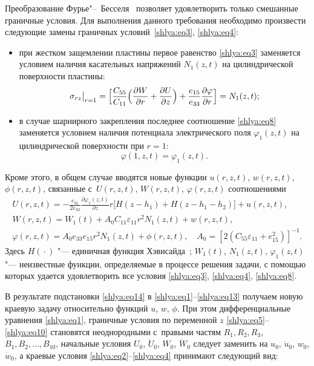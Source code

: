 Преобразование Фурье"--~Бесселя~\cite{shlya:bib23} позволяет удовлетворить только смешанные 
граничные условия. 
Для выполнения данного требования необходимо произвести следующие замены граничных условий~\eqref{shlya:eq3}, \eqref{shlya:eq4}:

\begin{itemize}
\item при жестком защемлении пластины первое равенство \eqref{shlya:eq3} заменяется условием 
наличия касательных напряжений $N_1 (z,t)$ на цилиндрической 
поверхности пластины: 
\begin{equation}
\label{shlya:eq13}
\sigma _{rz}\big|_{r=1} =
\Bigl[
\frac{C_{55}}{C_{11}}\Bigl(\frac{\partial 
W}{\partial r}+\frac{\partial U}{\partial z}\Bigr)+\frac{e_{15} }{e_{33}  }\frac{\partial \varphi }{\partial r}\Bigr] =N_1 (z,t);
\end{equation}

\item в случае шарнирного закрепления последнее соотношение \eqref{shlya:eq8} заменяется 
условием наличия потенциала электрического поля $\varphi _1 ( z,t)$ на цилиндрической поверхности при $r=1$:
\begin{equation}
\label{shlya:eq13}
\varphi ( {1,z,t} )=\varphi _1 ( {z,t} ).
\end{equation}
\end{itemize}

Кроме этого, в общем случае вводятся новые функции $u(r,z,t)$, $w(r,z,t)$, $\phi (r,z,t)$, связанные с~$U(r,z,t)$, $W(r,z,t)$, $\varphi (r,z,t)$ соотношениями
\begin{gather}
U(r,z,t)=-\frac{e_{31} }{2e_{33} }\frac{\partial \varphi _1 
(z,t)}{\partial z}r\big[ H(z-h_1)+H(z-h_1 -h_2) \big]+u(r,z,t),\\
W(r,z,t)=W_1 ( t )+A_0 C_{11} \varepsilon _{11} 
r^2N_1 (z,t)+w(r,z,t), \label{shlya:eq14}\\
\varphi (r,z,t)=A_0 e_{33} e_{15} r^2N_1 ( z,t)+\phi (r,z,t),
\quad
A_0 =\left[ 2 \left(C_{55} \varepsilon _{11} +e_{15}^2 \right) \right]^{-1}.
\end{gather}
Здесь $H({}\cdot{})$ "--- единичная функция Хэвисайда~\cite{shlya:bib25}; $W_1 (t )$, $N_1 (z,t)$, $\varphi _1 (z,t)$ "--- 
неизвестные функции, определяемые в процессе решения задачи, с помощью 
которых удается удовлетворить все условия \eqref{shlya:eq3}, \eqref{shlya:eq4}, \eqref{shlya:eq8}. 



В результате подстановки \eqref{shlya:eq14} в \eqref{shlya:eq1}--\eqref{shlya:eq13} получаем новую краевую задачу 
относительно функций $u$, $w$, $\phi$. 
При этом дифференциальные уравнения \eqref{shlya:eq1}, 
граничные условия по переменной $z$ \eqref{shlya:eq5}--\eqref{shlya:eq10} становятся неоднородными 
с~правыми частям $R_1, R_2, R_3 $, $B_1, B_2,\dots, B_{10} $, начальные условия $U_0$, $\dot {U}_0$, $W_0$, $\dot {W}_0$ следует заменить на $u_0$, $\dot {u}_0$, $w_0$, $\dot {w}_0$, а краевые условия \eqref{shlya:eq2}--\eqref{shlya:eq4} принимают следующий вид:

